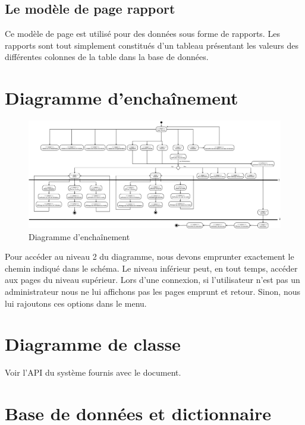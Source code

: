 \documentclass[letter, 11pt]{report}
\begin{document}
\subsection{Le modèle de page rapport}

Ce modèle de page est utilisé pour des données sous forme de rapports. Les rapports sont tout simplement constitués d'un tableau présentant les valeurs des différentes colonnes de la table dans la base de données.

\section{Diagramme d'enchaînement}

\begin{figure}[htbp]
	\begin{center}
		\includegraphics[scale=0.13]{diagrammeEnchainement.png}
	\end{center}
	\caption{Diagramme d'enchaînement}
\end{figure}

Pour accéder au niveau 2 du diagramme, nous devons emprunter exactement le chemin indiqué dans le schéma. Le niveau inférieur peut, en tout temps, accéder aux pages du niveau supérieur. Lors d'une connexion, si l'utilisateur n'est pas un administrateur nous ne lui affichons pas les pages emprunt et retour. Sinon, nous lui rajoutons ces options dans le menu.

\section{Diagramme de classe}

Voir l'API du système fournis avec le document.

\section{Base de données et dictionnaire}
\end{document}
